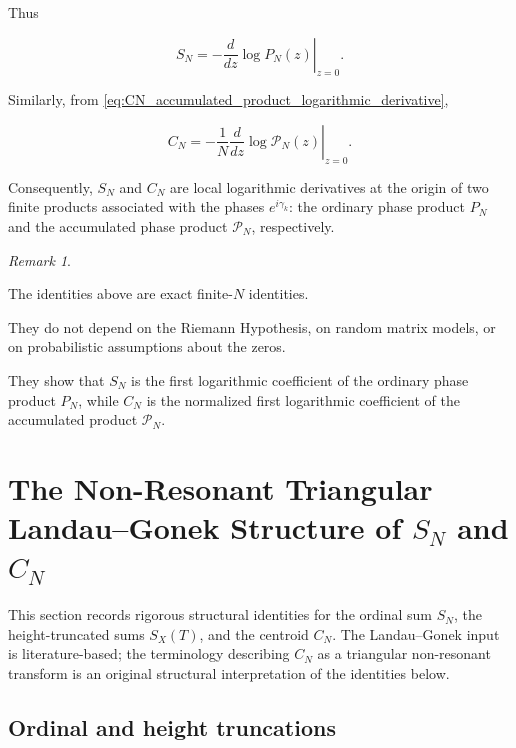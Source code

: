 \documentclass[11pt]{amsart}
\numberwithin{equation}{section}
\theoremstyle{plain}
\theoremstyle{definition}
\theoremstyle{remark}
\newtheorem{remark}[theorem]{Remark}
\begin{document}
Thus

\begin{equation}
S_N
=
-
\left.
\frac{d}{dz}
\log P_N(z)
\right|_{z=0}.
\label{eq:SN_local_analytic_interpretation}
\end{equation}

Similarly, from
\eqref{eq:CN_accumulated_product_logarithmic_derivative},

\begin{equation}
C_N
=
-
\frac{1}{N}
\left.
\frac{d}{dz}
\log \mathcal{P}_N(z)
\right|_{z=0}.
\label{eq:CN_local_analytic_interpretation}
\end{equation}

Consequently, \(S_N\) and \(C_N\) are local logarithmic derivatives at
the origin of two finite products associated with the phases
\(e^{i\gamma_k}\): the ordinary phase product \(P_N\) and the accumulated
phase product \(\mathcal{P}_N\), respectively.

\begin{remark}
\label{rem:product_form_summary}

The identities above are exact finite-\(N\) identities.

They do not depend on the Riemann Hypothesis, on random matrix models,
or on probabilistic assumptions about the zeros.

They show that \(S_N\) is the first logarithmic coefficient of the
ordinary phase product \(P_N\), while \(C_N\) is the normalized first
logarithmic coefficient of the accumulated product
\(\mathcal{P}_N\).

\end{remark}


\section{The Non-Resonant Triangular Landau--Gonek Structure of \(S_N\) and \(C_N\)}
\label{sec:non_resonant_triangular_lg_structure}

This section records rigorous structural identities for the ordinal sum
\(S_N\), the height-truncated sums \(S_X(T)\), and the centroid \(C_N\).
The Landau--Gonek input is literature-based; the terminology describing
\(C_N\) as a triangular non-resonant transform is an original structural
interpretation of the identities below.

\subsection{Ordinal and height truncations}
\label{subsec:ordinal_and_height_truncations}
\end{document}
